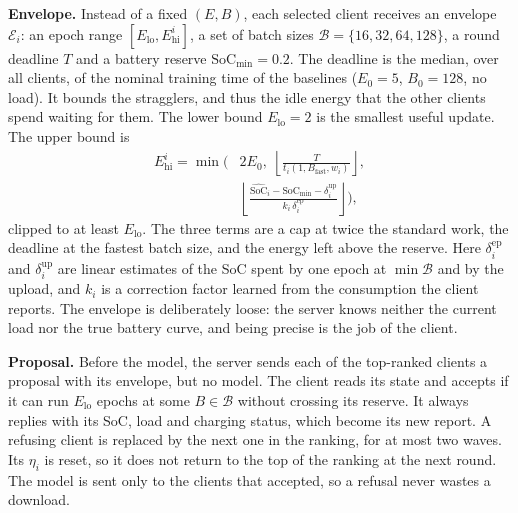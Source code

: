 \textbf{Envelope.}
Instead of a fixed $(E,B)$, each selected client receives an envelope
$\mathcal{E}_i$: an epoch range $[E_{\mathrm{lo}},E_{\mathrm{hi}}^i]$, a set of
batch sizes $\mathcal{B}=\{16,32,64,128\}$, a round deadline $T$ and a battery
reserve $\mathrm{SoC}_{\min}=0.2$. The deadline is the median, over all
clients, of the nominal training time of the baselines ($E_0=5$, $B_0=128$, no
load). It bounds the stragglers, and thus the idle energy that the other
clients spend waiting for them. The lower bound $E_{\mathrm{lo}}=2$ is the
smallest useful update. The upper bound is
\begin{equation}
  \begin{aligned}
  E_{\mathrm{hi}}^i = \min\biggl(&2E_0,\;
    \left\lfloor \frac{T}{t_i(1,B_{\mathrm{fast}},w_i)} \right\rfloor,\\
  &\left\lfloor \frac{\widehat{\mathrm{SoC}}_i - \mathrm{SoC}_{\min}
    - \delta^{\mathrm{up}}_i}{k_i\,\delta^{\mathrm{ep}}_i} \right\rfloor \biggr),
  \end{aligned}
  \label{eq:ehi}
\end{equation}
clipped to at least $E_{\mathrm{lo}}$. The three terms are a cap at twice the
standard work, the deadline at the fastest batch size, and the energy left
above the reserve. Here $\delta^{\mathrm{ep}}_i$ and $\delta^{\mathrm{up}}_i$
are linear estimates of the SoC spent by one epoch at $\min\mathcal{B}$ and by
the upload, and $k_i$ is a correction factor learned from the consumption the
client reports. The envelope is deliberately loose: the server knows neither
the current load nor the true battery curve, and being precise is the job of
the client.

\textbf{Proposal.}
Before the model, the server sends each of the top-ranked clients a proposal
with its envelope, but no model. The client reads its state and accepts if it
can run $E_{\mathrm{lo}}$ epochs at some $B\in\mathcal{B}$ without crossing its
reserve. It always replies with its SoC, load and charging status, which become
its new report. A refusing client is replaced by the next one in the ranking,
for at most two waves. Its $\eta_i$ is reset, so it does not return to the top
of the ranking at the next round. The model is sent only to the clients that
accepted, so a refusal never wastes a download.


